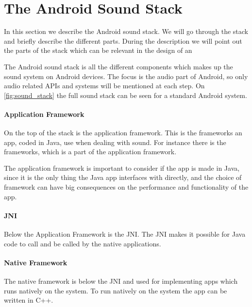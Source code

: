 \section{The Android Sound Stack}
In this section we describe the Android sound stack.
We will go through the stack and briefly describe the different parts.
During the description we will point out the parts of the stack which can be relevant in the design of an 

The Android sound stack is all the different components which makes up the sound system on Android devices.
The focus is the audio part of Android, so only audio related \acp{API} and systems will be mentioned at each step. 
On \cref{fig:sound_stack} the full sound stack can be seen for a standard Android system.

\paragraph{Application Framework}
On the top of the stack is the application framework.
This is the frameworks an app, coded in Java, use when dealing with sound.
For instance there is the  frameworks, which is a part of the application framework.

The application framework is important to consider if the app is made in Java,
since it is the only thing the Java app interfaces with directly, 
and the choice of framework can have big consequences on the performance and functionality of the app.%

\paragraph{JNI}
Below the Application Framework is the \ac{JNI}.
The \ac{JNI} makes it possible for Java code to call and be called by the native applications\cite{jni}.

\paragraph{Native Framework}
The native framework is below the \ac{JNI} and used for implementing apps which runs natively on the system.
To run natively on the system the app can be written in C++.


